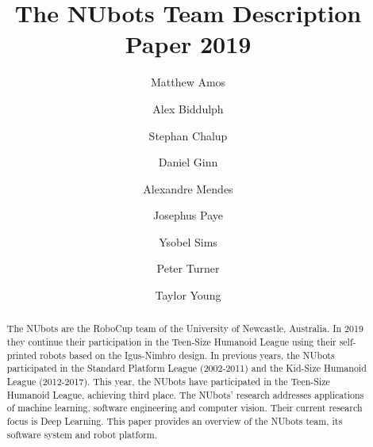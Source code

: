 \documentclass{llncs}
\begin{document}
%

\frontmatter          %
%
\pagestyle{headings}  %
%
%
\mainmatter              %
%
\title{The NUbots Team Description Paper 2019}
%

\author{Matthew Amos
        \and Alex Biddulph
        \and Stephan Chalup
        \and Daniel Ginn
		\and Alexandre Mendes
        \and Josephus Paye
        \and Ysobel Sims
        \and Peter Turner
        \and Taylor Young
        }
       
%
%

%
%

\maketitle              %


\begin{abstract}
The NUbots are the RoboCup team of the University of Newcastle, Australia. In 2019 they continue their participation in the Teen-Size Humanoid League using their self-printed robots based on the Igus-Nimbro design. In previous years, the NUbots participated in the Standard Platform League (2002-2011) and the Kid-Size Humanoid League (2012-2017). This year, the NUbots have participated in the Teen-Size Humanoid League, achieving third place. The NUbots' research addresses applications of machine learning, software engineering and computer vision. Their current research focus is Deep Learning. This paper provides an overview of the NUbots team, its software system and robot platform.
\end{abstract}
\end{document}
